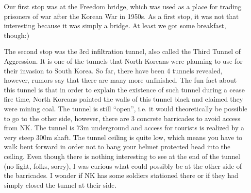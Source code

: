 \begin{post}
\begin{content}
\begin{figure}
\centering{}
\vspace{-26pt}
\end{figure}Our first stop was at the Freedom bridge, which was used as a place for trading prisoners of war after the Korean War in 1950s. As a first stop, it was not that interesting because it was simply a bridge. At least we got some breakfast, though:)

The second stop was the 3rd infiltration tunnel, also called the Third Tunnel of Aggression. It is one of the tunnels that North Koreans were planning to use for their invasion to South Korea. So far, there have been 4 tunnels revealed, however, rumors say that there are many more unfinished. The fun fact about this tunnel is that in order to explain the existence of such tunnel during a cease fire time, North Koreans painted the walls of this tunnel black and claimed they were mining coal. The tunnel is still ``open'', i.e. it would theoretically be possible to go to the other side, however, there are 3 concrete barricades to avoid access from NK. The tunnel is 73m underground and access for tourists is realized by a very steep 300m shaft. The tunnel ceiling is quite low, which means you have to walk bent forward in order not to bang your helmet protected head into the ceiling. Even though there is nothing interesting to see at the end of the tunnel (no light, folks, sorry), I was curious what could possibly be at the other side of the barricades. I wonder if NK has some soldiers stationed there or if they had simply closed the tunnel at their side.



\end{content}
\end{post}
